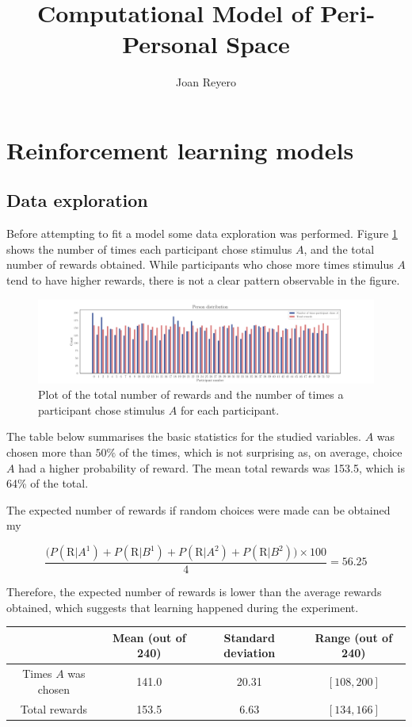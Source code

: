 \documentclass[12pt]{article}
\title{Computational Model of Peri-Personal Space}
\author{Joan Reyero}
\begin{document}
\maketitle

\section{Reinforcement learning models}

\subsection{Data exploration}

Before attempting to fit a model some data exploration was performed. Figure \ref{fig:2.1} shows the number of times each participant chose stimulus $A$, and the total number of rewards obtained. While participants who chose more times stimulus $A$ tend to have higher rewards, there is not a clear pattern observable in the figure. 

\begin{figure}[h!]
	\centering
	\hspace*{-0.6in}
	\includegraphics[width=1.2\linewidth]{figures/2.1.pdf}
	\caption{Plot of the total number of rewards and the number of times a participant chose stimulus $A$ for each participant.}
	\label{fig:2.1}
\end{figure}

The table below summarises the basic statistics for the studied variables. $A$ was chosen more than $50\%$ of the times, which is not surprising as, on average, choice $A$ had a higher probability of reward. The mean total rewards was 153.5, which is 64\% of the total.

The expected number of rewards if random choices were made can be obtained my

\[ \frac{\big(P(\mathrm{R} | A^1) + P(\mathrm{R} | B^1) + P(\mathrm{R} | A^2) + P(\mathrm{R} | B^2)\big) \times 100}{4} = 56.25 \]

Therefore, the expected number of rewards is lower than the average rewards obtained, which suggests that learning happened during the experiment.

\begin{center}
 \begin{tabular}{|c || c | c | c|} 
 \hline
  & Mean (out of 240) & Standard deviation & Range (out of 240) \\ [0.5ex] 
 \hline\hline
 Times $A$ was chosen & 141.0 & 20.31 & $[108, 200]$ \\ 
 \hline
 Total rewards & 153.5 & 6.63 & $[134,166]$ \\ [1ex] 
 \hline
\end{tabular}
\end{center}




\end{document}
